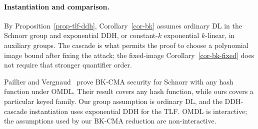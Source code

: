 \paragraph*{Instantiation and comparison.}
By Proposition~\ref{prop-tlf-ddh}, Corollary~\ref{cor-bk} assumes ordinary DL
in the Schnorr group and exponential DDH, or constant-$k$ exponential
$k$-linear, in auxiliary groups. The cascade is what permits the proof to
choose a polynomial image bound after fixing the attack; the fixed-image
Corollary~\ref{cor-bk-fixed} does not require that stronger quantifier order.

Paillier and Vergnaud~\cite{AC:PaiVer05} prove BK-CMA security for Schnorr with
any hash function under OMDL. Their result covers any hash function, while ours
covers a particular keyed family. Our group assumption is ordinary DL, and the
DDH-cascade instantiation uses exponential DDH for the TLF. OMDL is
interactive; the assumptions used by our BK-CMA reduction are non-interactive.
